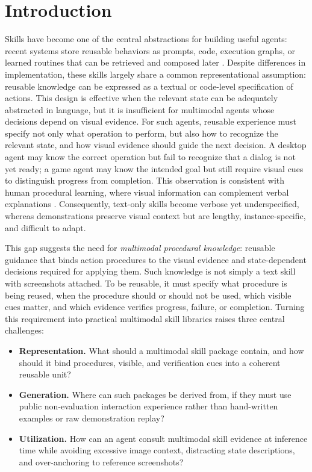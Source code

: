 
\section{Introduction}
\label{sec:introduction}

Skills have become one of the central abstractions for building useful agents: recent systems store reusable behaviors as prompts, code, execution graphs, or learned routines that can be retrieved and composed later \citep{wang2023voyager,zheng2025skillweaver,chen2026cuaskill,wang2026skillx}. Despite differences in implementation, these skills largely share a common representational assumption: reusable knowledge can be expressed as a textual or code-level specification of actions. This design is effective when the relevant state can be adequately abstracted in language, but it is insufficient for multimodal agents whose decisions depend on visual evidence. For such agents, reusable experience must specify not only what operation to perform, but also how to recognize the relevant state, and how visual evidence should guide the next decision.
A desktop agent may know the correct operation but fail to recognize that a dialog is not yet ready; a game agent may know the intended goal but still require visual cues to distinguish progress from completion.
This observation is consistent with human procedural learning, where visual information can complement verbal explanations \citep{mayer2009multimedia}.
Consequently, text-only skills become verbose yet underspecified, whereas demonstrations preserve visual context but are lengthy, instance-specific, and difficult to adapt.

This gap suggests the need for \emph{multimodal procedural knowledge}: reusable guidance that binds action procedures to the visual evidence and state-dependent decisions required for applying them.
Such knowledge is not simply a text skill with screenshots attached.
To be reusable, it must specify what procedure is being reused, when the procedure should or should not be used, which visible cues matter, and which evidence verifies progress, failure, or completion.
Turning this requirement into practical multimodal skill libraries raises three central challenges:
\begin{itemize}[leftmargin=*]
    \item \textbf{Representation.} What should a multimodal skill package contain, and how should it bind procedures, visible, and verification cues into a coherent reusable unit?
    \item \textbf{Generation.} Where can such packages be derived from, if they must use public non-evaluation interaction experience rather than hand-written examples or raw demonstration replay?
    \item \textbf{Utilization.} How can an agent consult multimodal skill evidence at inference time while avoiding excessive image context, distracting state descriptions, and over-anchoring to reference screenshots?
\end{itemize}

